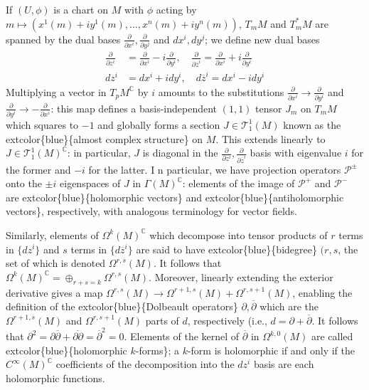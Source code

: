 \documentclass[
]{book}
\begin{document}
If \((U,\phi)\) is a chart on \(M\) with \(\phi\) acting by \(m \mapsto (x^1(m) + iy^1(m), \dots, x^n(m) + iy^n(m))\), \(T_m M\) and \(T_m^* M\) are spanned by the dual bases \(\frac{\partial}{\partial x^i}, \frac{\partial}{\partial y^j}\) and \(dx^i, dy^j\); we define new dual bases
\begin{equation}
    \begin{aligned}
        \frac{\partial}{\partial z^i} &= \frac{\partial}{\partial x^i} - i\frac{\partial}{\partial y^i}, \quad 
        \frac{\partial}{\partial \overline{z}^i} = \frac{\partial}{\partial x^i} + i\frac{\partial}{\partial y^i} \\
        dz^i &= dx^i + idy^i, \quad d\overline{z}^i = dx^i - idy^i
    \end{aligned}
\end{equation}
Multiplying a vector in \(T_p M^{\mathbb{C}}\) by \(i\) amounts to the substitutions \(\tfrac{\partial}{\partial x^i} \to \tfrac{\partial}{\partial y^i}\) and \(\tfrac{\partial}{\partial y^i} \to -\tfrac{\partial}{\partial x^i}\): this map defines a basis-independent \((1,1)\) tensor \(J_m\) on \(T_m M\) which squares to \(-1\) and globally forms a section \(J \in \mathcal{T}^1_1(M)\) known as the extcolor\{blue\}\{almost complex structure\} on \(M\). This extends linearly to \(J \in \mathcal{T}^1_1(M)^{\mathbb{C}}\): in particular, \(J\) is diagonal in the \(\frac{\partial}{\partial z^i}, \frac{\partial}{\partial \overline{z}^i}\) basis with eigenvalue \(i\) for the former and \(-i\) for the latter.
I
n particular, we have projection operators \(\mathcal{P}^\pm\) onto the \(\pm i\) eigenspaces of \(J\) in \(\Gamma(M)^{\mathbb{C}}\): elements of the image of \(\mathcal{P}^+\) and \(\mathcal{P}^-\) are extcolor\{blue\}\{holomorphic vectors\} and extcolor\{blue\}\{antiholomorphic vectors\}, respectively, with analogous terminology for vector fields.

Similarly, elements of \(\Omega^k(M)^{\mathbb{C}}\) which decompose into tensor products of \(r\) terms in \(\{dz^i\}\) and \(s\) terms in \(\{d\overline{z}^i\}\) are said to have extcolor\{blue\}\{bidegree\} \((r,s\), the set of which is denoted \(\Omega^{r,s}(M)\). It follows that \(\Omega^k(M)^{\mathbb{C}} = \oplus_{r+s=k} \Omega^{r,s}(M)\). Moreover, linearly extending the exterior derivative gives a map \(\Omega^{r,s}(M) \to \Omega^{r+1,s}(M) + \Omega^{r,s+1}(M)\), enabling the definition of the extcolor\{blue\}\{Dolbeault operators\} \(\partial, \overline{\partial}\) which are the \(\Omega^{r+1,s}(M)\) and \(\Omega^{r,s+1}(M)\) parts of \(d\), respectively (i.e., \(d = \partial + \overline{\partial}\). It follows that \(\partial^2 = \partial\overline{\partial} + \overline{\partial\partial} = \overline{\partial}^2 = 0\). Elements of the kernel of \(\overline{\partial}\) in \(\Omega^{k,0}(M)\) are called extcolor\{blue\}\{holomorphic \(k\)-forms\}; a \(k\)-form is holomorphic if and only if the \(C^\infty(M)^{\mathbb{C}}\) coefficients of the decomposition into the \(dz^i\) basis are each holomorphic functions.
\end{document}
